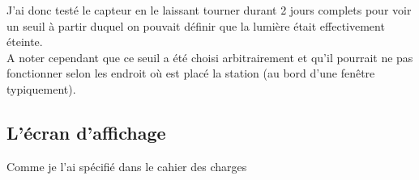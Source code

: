 J'ai donc testé le capteur en le laissant tourner durant 2 jours complets pour voir un seuil à partir duquel on pouvait définir que la lumière était effectivement éteinte.\\

A noter cependant que ce seuil a été choisi arbitrairement et qu'il pourrait ne pas fonctionner selon les endroit où est placé la station (au bord d'une fenêtre typiquement).


\subsection{L'écran d'affichage}

Comme je l'ai spécifié dans le cahier des charges


